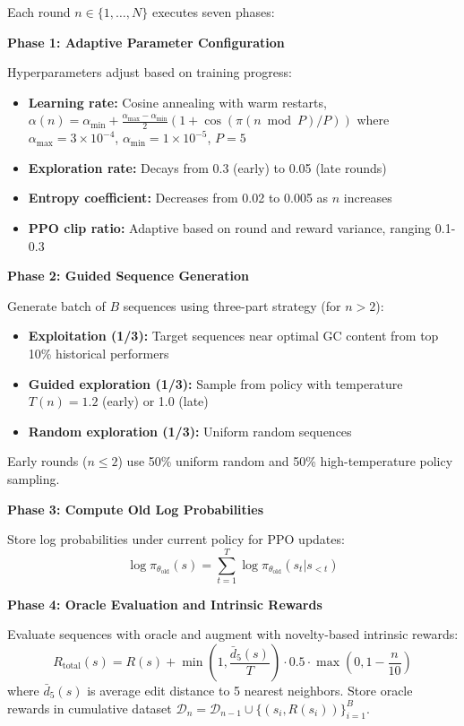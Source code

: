 \documentclass[conference]{IEEEtran}
\begin{document}
Each round $n \in \{1, \ldots, N\}$ executes seven phases:

\textbf{Phase 1: Adaptive Parameter Configuration}

Hyperparameters adjust based on training progress:
\begin{itemize}
    \item \textbf{Learning rate:} Cosine annealing with warm restarts, $\alpha(n) = \alpha_{\min} + \frac{\alpha_{\max} - \alpha_{\min}}{2}(1 + \cos(\pi(n \bmod P)/P))$ where $\alpha_{\max} = 3 \times 10^{-4}$, $\alpha_{\min} = 1 \times 10^{-5}$, $P = 5$
    \item \textbf{Exploration rate:} Decays from 0.3 (early) to 0.05 (late rounds)
    \item \textbf{Entropy coefficient:} Decreases from 0.02 to 0.005 as $n$ increases
    \item \textbf{PPO clip ratio:} Adaptive based on round and reward variance, ranging 0.1-0.3
\end{itemize}

\textbf{Phase 2: Guided Sequence Generation}

Generate batch of $B$ sequences using three-part strategy (for $n > 2$):
\begin{itemize}
    \item \textbf{Exploitation (1/3):} Target sequences near optimal GC content from top 10\% historical performers
    \item \textbf{Guided exploration (1/3):} Sample from policy with temperature $T(n) = 1.2$ (early) or 1.0 (late)
    \item \textbf{Random exploration (1/3):} Uniform random sequences
\end{itemize}
Early rounds ($n \leq 2$) use 50\% uniform random and 50\% high-temperature policy sampling.

\textbf{Phase 3: Compute Old Log Probabilities}

Store log probabilities under current policy for PPO updates:
\begin{equation}
\log \pi_{\theta_{\text{old}}}(s) = \sum_{t=1}^{T} \log \pi_{\theta_{\text{old}}}(s_t | s_{<t})
\end{equation}

\textbf{Phase 4: Oracle Evaluation and Intrinsic Rewards}

Evaluate sequences with oracle and augment with novelty-based intrinsic rewards:
\begin{equation}
R_{\text{total}}(s) = R(s) + \min\left(1, \frac{\bar{d}_5(s)}{T}\right) \cdot 0.5 \cdot \max\left(0, 1 - \frac{n}{10}\right)
\end{equation}
where $\bar{d}_5(s)$ is average edit distance to 5 nearest neighbors. Store oracle rewards in cumulative dataset $\mathcal{D}_n = \mathcal{D}_{n-1} \cup \{(s_i, R(s_i))\}_{i=1}^{B}$.
\end{document}
